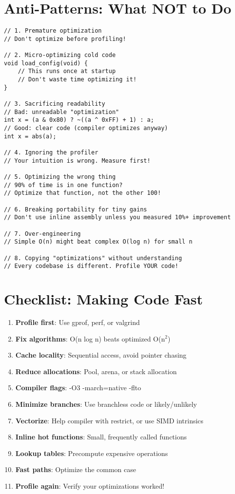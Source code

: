 \section{Anti-Patterns: What NOT to Do}

\begin{lstlisting}
// 1. Premature optimization
// Don't optimize before profiling!

// 2. Micro-optimizing cold code
void load_config(void) {
    // This runs once at startup
    // Don't waste time optimizing it!
}

// 3. Sacrificing readability
// Bad: unreadable "optimization"
int x = (a & 0x80) ? ~((a ^ 0xFF) + 1) : a;
// Good: clear code (compiler optimizes anyway)
int x = abs(a);

// 4. Ignoring the profiler
// Your intuition is wrong. Measure first!

// 5. Optimizing the wrong thing
// 90% of time is in one function?
// Optimize that function, not the other 100!

// 6. Breaking portability for tiny gains
// Don't use inline assembly unless you measured 10%+ improvement

// 7. Over-engineering
// Simple O(n) might beat complex O(log n) for small n

// 8. Copying "optimizations" without understanding
// Every codebase is different. Profile YOUR code!
\end{lstlisting}

\section{Checklist: Making Code Fast}

\begin{enumerate}
    \item \textbf{Profile first}: Use gprof, perf, or valgrind
    \item \textbf{Fix algorithms}: O(n log n) beats optimized O(n$^2$)
    \item \textbf{Cache locality}: Sequential access, avoid pointer chasing
    \item \textbf{Reduce allocations}: Pool, arena, or stack allocation
    \item \textbf{Compiler flags}: -O3 -march=native -flto
    \item \textbf{Minimize branches}: Use branchless code or likely/unlikely
    \item \textbf{Vectorize}: Help compiler with restrict, or use SIMD intrinsics
    \item \textbf{Inline hot functions}: Small, frequently called functions
    \item \textbf{Lookup tables}: Precompute expensive operations
    \item \textbf{Fast paths}: Optimize the common case
    \item \textbf{Profile again}: Verify your optimizations worked!
\end{enumerate}


